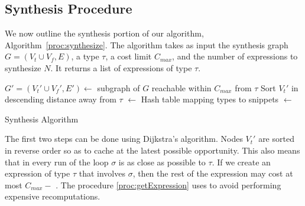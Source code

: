 \subsection{Synthesis Procedure}
\label{sec:algorithm:synthesis}
We now outline the synthesis portion of our algorithm, Algorithm~\ref{proc:synthesize}. The algorithm takes as input the synthesis graph $G=(V_t \cup V_f, E)$, a type $\tau$, a cost limit $C_{max}$, and the number of expressions to synthesize $N$. It returns a list of expressions of type $\tau$.
\begin{algorithm}[hbt]
\BlankLine
$G'=(V_t'\cup V_f', E') \longleftarrow$ subgraph of $G$ reachable within $C_{max}$ from $\tau$ \;
Sort $V_t'$ in descending distance away from $\tau$ \;
\Snips $\longleftarrow$ Hash table mapping types to snippets \;
\Exprs $\longleftarrow$ \Snips[$\tau$] \;
\caption{Synthesis Algorithm}\label{proc:synthesize}
\end{algorithm}
The first two steps can be done using Dijkstra's algorithm. Nodes $V_t'$ are sorted in reverse order so as
to cache at the latest possible opportunity. This also means that in every run of the loop 
$\sigma$ is as close as possible to $\tau$. If we
create an expression of type  $\tau$ that involves $\sigma$, then the rest of the expression may cost at most $C_{max} - $
\Dist{$\sigma$}. The procedure \ref{proc:getExpression} uses \Snips to
avoid performing expensive recomputations.


